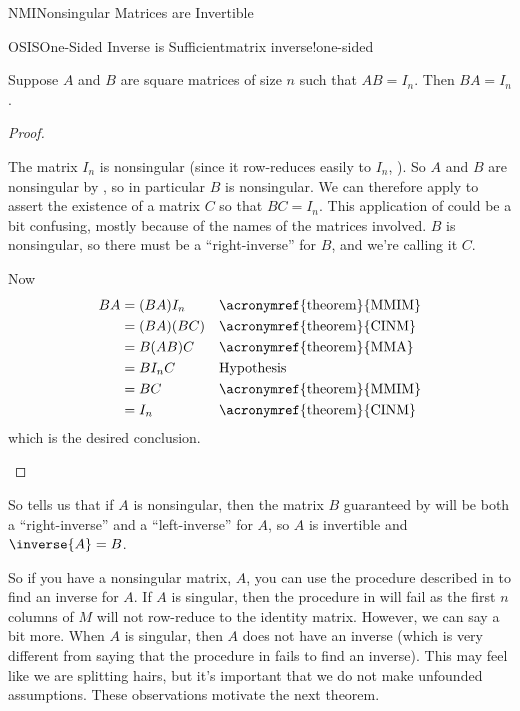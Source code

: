 \begin{subsect}{NMI}{Nonsingular Matrices are Invertible}
\begin{theorem}{OSIS}{One-Sided Inverse is Sufficient}{matrix inverse!one-sided}
\begin{para}Suppose $A$ and $B$ are  square matrices of size $n$ such that $AB=I_n$.  Then $BA=I_n$.\end{para}
\end{theorem}
%
\begin{proof}
\begin{para}The matrix $I_n$ is nonsingular (since it row-reduces easily to $I_n$, ).  So $A$ and $B$ are nonsingular by , so in particular $B$ is nonsingular.  We can therefore apply  to assert the existence of a matrix $C$ so that $BC=I_n$.  This application of  could be a bit confusing, mostly because of the names of the matrices involved.  $B$ is nonsingular, so there must be a ``right-inverse'' for $B$, and we're calling it $C$.\end{para}
%
\begin{para}Now
%
\begin{align*}
BA
&=(BA)I_n&&\text{\acronymref{theorem}{MMIM}}\\
&=(BA)(BC)&&\text{\acronymref{theorem}{CINM}}\\
&=B(AB)C&&\text{\acronymref{theorem}{MMA}}\\
&=BI_nC&&\text{Hypothesis}\\
&=BC&&\text{\acronymref{theorem}{MMIM}}\\
&=I_n&&\text{\acronymref{theorem}{CINM}}
\end{align*}
%
which is the desired conclusion.\end{para}
%
\end{proof}
%
\begin{para}So  tells us that if $A$ is nonsingular, then the matrix $B$ guaranteed by  will be both a ``right-inverse'' and a ``left-inverse'' for $A$, so $A$ is invertible and $\inverse{A}=B$.\end{para}
%
\begin{para}So if you have a nonsingular matrix, $A$, you can use the procedure described in  to find an inverse for $A$.  If $A$ is singular, then the procedure in  will fail as the first $n$ columns of $M$ will not row-reduce to the identity matrix.  However, we can say a bit more.  When $A$ is singular, then $A$ does not have an inverse (which is very different from saying that the procedure in  fails to find an inverse).
This may feel like we are splitting hairs, but it's important that we do not make unfounded assumptions.  These observations motivate the next theorem.\end{para}

\end{subsect}
